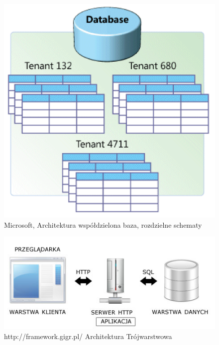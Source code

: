 \documentclass[a4paper,10pt, twoside]{report}
\begin{document}
\begin{large}
\begin{figure}[H]           %
    \centering
    \includegraphics[width=12cm]{figures/multitenant_4.png}
    \caption{Microsoft, Architektura współdzielona baza, rozdzielne schematy}
    \label{fig:multitenant}
\end{figure}

\begin{figure}[H]           %
    \centering
    \includegraphics[width=12cm]{figures/framwork-gigr-pl_architektura_www.jpg}
    \caption{http://framework.gigr.pl/ Architektura Trójwarstwowa}
    \label{fig:architeturatrojwarstwowa}
\end{figure}



\end{large}
\end{document}
